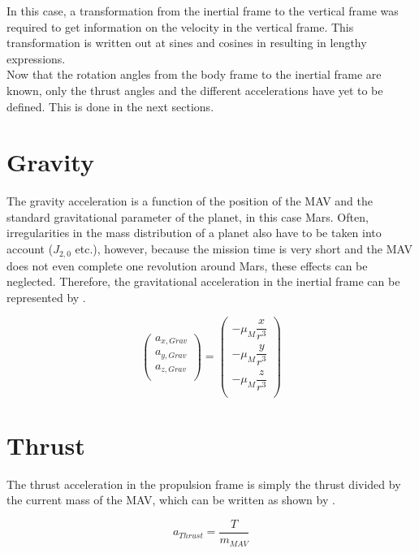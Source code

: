 In this case, a transformation from the inertial frame to the vertical frame was required to get information on the velocity in the vertical frame. This transformation is written out at sines and cosines in  resulting in lengthy expressions. \\

Now that the rotation angles from the body frame to the inertial frame are known, only the thrust angles and the different accelerations have yet to be defined. This is done in the next sections.


\section{Gravity}
\label{sec:gravityModel}
The gravity acceleration is a function of the position of the \ac{MAV} and the standard gravitational parameter of the planet, in this case Mars. Often, irregularities in the mass distribution of a planet also have to be taken into account ($J_{2,0}$ etc.), however, because the mission time is very short and the \ac{MAV} does not even complete one revolution around Mars, these effects can be neglected. Therefore, the gravitational acceleration in the inertial frame can be represented by .

\begin{equation} \label{eq:gravityModel}
\begin{pmatrix}
a_{x,Grav}\\
a_{y,Grav}\\
a_{z,Grav}\\
\end{pmatrix}
=
\begin{pmatrix}
-\mu_{M}\dfrac{x}{r^{3}}\\
-\mu_{M}\dfrac{y}{r^{3}}\\
-\mu_{M}\dfrac{z}{r^{3}}\\
\end{pmatrix}
\end{equation}


\section{Thrust}
\label{sec:thrustModel}
The thrust acceleration in the propulsion frame is simply the thrust divided by the current mass of the \ac{MAV}, which can be written as shown by .

\begin{equation} \label{eq:thrustModel}
a_{Thrust}=\dfrac{T}{m_{MAV}}
\end{equation}

